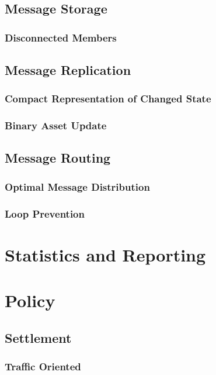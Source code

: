 \subsection{Message Storage}

\subsubsection{Disconnected Members}

\subsection{Message Replication}

  \subsubsection{Compact Representation of Changed State}
  
  \subsubsection{Binary Asset Update}
  
\subsection{Message Routing}

  \subsubsection{Optimal Message Distribution}
 
  \subsubsection{Loop Prevention}

\section{Statistics and Reporting}

\section{Policy}

\subsection{Settlement}

\subsubsection{Traffic Oriented}

